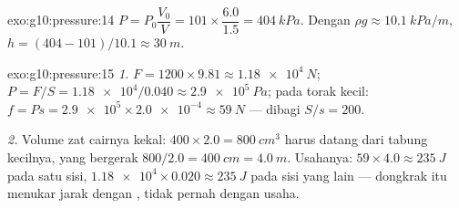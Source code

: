 \begin{solution}{exo:g10:pressure:14}
$P = P_0 \dfrac{V_0}{V} = 101 \times \dfrac{6.0}{1.5} =
\qty{404}{kPa}$. Dengan $\rho g \approx \qty{10.1}{kPa/m}$,
$h = (404 - 101)/10.1 \approx \qty{30}{m}$.
\end{solution}

\begin{solution}{exo:g10:pressure:15}
\emph{1.}  $F = 1200 \times 9.81 \approx \qty{1.18e4}{N}$;
 $P = F/S = \num{1.18e4}/0.040 \approx \qty{2.9e5}{Pa}$; pada
torak kecil: $f = P s = \num{2.9e5} \times \num{2.0e-4} \approx \qty{59}{N}$ ---  dibagi $S/s = 200$.

\emph{2.} Volume zat cairnya kekal:
$400 \times 2.0 = \qty{800}{cm^3}$ harus datang dari tabung kecilnya,
yang bergerak $800/2.0 = \qty{400}{cm} = \qty{4.0}{m}$. Usahanya:
$59 \times 4.0 \approx \qty{235}{J}$ pada satu sisi,
$\num{1.18e4} \times 0.020 \approx \qty{235}{J}$ pada sisi yang lain ---
dongkrak itu menukar jarak dengan , tidak pernah dengan usaha.
\end{solution}

